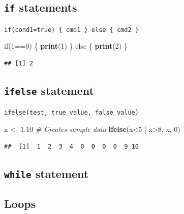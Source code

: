 \documentclass[]{article}
\newenvironment{Shaded}{\begin{snugshade}}{\end{snugshade}}
\newcommand{\KeywordTok}[1]{\textcolor[rgb]{0.13,0.29,0.53}{\textbf{{#1}}}}
\newcommand{\DecValTok}[1]{\textcolor[rgb]{0.00,0.00,0.81}{{#1}}}
\newcommand{\StringTok}[1]{\textcolor[rgb]{0.31,0.60,0.02}{{#1}}}
\newcommand{\CommentTok}[1]{\textcolor[rgb]{0.56,0.35,0.01}{\textit{{#1}}}}
\newcommand{\NormalTok}[1]{{#1}}
\numberwithin{equation}{section}
\begin{document}
\subsection{\texorpdfstring{\texttt{if}
statements}{if statements}}\label{if-statements}

\texttt{if(cond1=true)\ \{\ cmd1\ \}\ else\ \{\ cmd2\ \}}

\begin{Shaded}
\begin{Highlighting}[]
\NormalTok{if(}\DecValTok{1}\NormalTok{==}\DecValTok{0}\NormalTok{) \{}
    \KeywordTok{print}\NormalTok{(}\DecValTok{1}\NormalTok{)}
\NormalTok{\} else \{}
    \KeywordTok{print}\NormalTok{(}\DecValTok{2}\NormalTok{)}
\NormalTok{\}}
\end{Highlighting}
\end{Shaded}

\begin{verbatim}
## [1] 2
\end{verbatim}

\subsection{\texorpdfstring{\texttt{ifelse}
statement}{ifelse statement}}\label{ifelse-statement}

\texttt{ifelse(test,\ true\_value,\ false\_value)}

\begin{Shaded}
\begin{Highlighting}[]
\NormalTok{x <-}\StringTok{ }\DecValTok{1}\NormalTok{:}\DecValTok{10} \CommentTok{# Creates sample data}
\KeywordTok{ifelse}\NormalTok{(x<}\DecValTok{5} \NormalTok{|}\StringTok{ }\NormalTok{x>}\DecValTok{8}\NormalTok{, x, }\DecValTok{0}\NormalTok{)}
\end{Highlighting}
\end{Shaded}

\begin{verbatim}
##  [1]  1  2  3  4  0  0  0  0  9 10
\end{verbatim}

\subsection{\texorpdfstring{\texttt{while}
statement}{while statement}}\label{while-statement}

\subsection{Loops}\label{loops}
\end{document}
